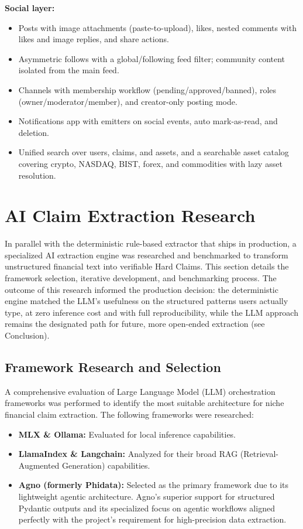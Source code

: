 \documentclass[a4paper,12pt]{report}
\begin{document}
\textbf{Social layer:}
\begin{itemize}
    \item Posts with image attachments (paste-to-upload), likes, nested comments with likes and image replies, and share actions.
    \item Asymmetric follows with a global/following feed filter; community content isolated from the main feed.
    \item Channels with membership workflow (pending/approved/banned), roles (owner/moderator/member), and creator-only posting mode.
    \item Notifications app with emitters on social events, auto mark-as-read, and deletion.
    \item Unified search over users, claims, and assets, and a searchable asset catalog covering crypto, NASDAQ, BIST, forex, and commodities with lazy asset resolution.
\end{itemize}

\section{AI Claim Extraction Research}
\label{sec:ai_engine}

In parallel with the deterministic rule-based extractor that ships in production, a specialized AI extraction engine was researched and benchmarked to transform unstructured financial text into verifiable Hard Claims. This section details the framework selection, iterative development, and benchmarking process. The outcome of this research informed the production decision: the deterministic engine matched the LLM's usefulness on the structured patterns users actually type, at zero inference cost and with full reproducibility, while the LLM approach remains the designated path for future, more open-ended extraction (see Conclusion).

\subsection{Framework Research and Selection}

A comprehensive evaluation of Large Language Model (LLM) orchestration frameworks was performed to identify the most suitable architecture for niche financial claim extraction. The following frameworks were researched:
\begin{itemize}
    \item \textbf{MLX \& Ollama:} Evaluated for local inference capabilities.
    \item \textbf{LlamaIndex \& Langchain:} Analyzed for their broad RAG (Retrieval-Augmented Generation) capabilities.
    \item \textbf{Agno (formerly Phidata):} Selected as the primary framework due to its lightweight agentic architecture. Agno's superior support for structured Pydantic outputs and its specialized focus on agentic workflows aligned perfectly with the project's requirement for high-precision data extraction.
\end{itemize}
\end{document}
